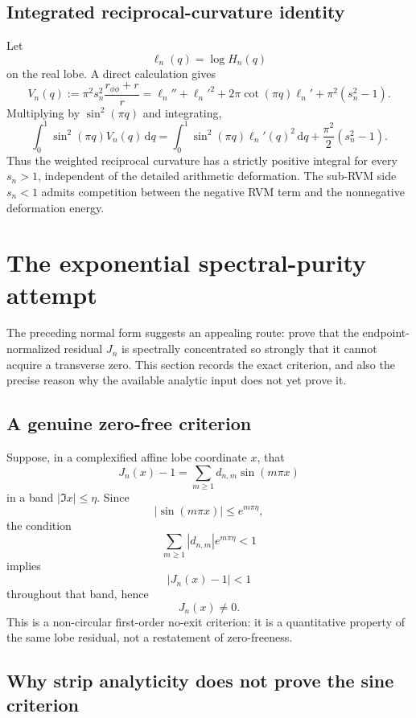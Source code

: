 \documentclass[11pt]{article}
\theoremstyle{definition}
\begin{document}
\subsection{Integrated reciprocal-curvature identity}

Let
\[
\ell_n(q)=\log H_n(q)
\]
on the real lobe.  A direct calculation gives
\[
\boxed{
V_n(q)
:=
\pi^2s_n^2\frac{r_{\phi\phi}+r}{r}
=
\ell_n''
+\ell_n'^2
+2\pi\cot(\pi q)\ell_n'
+\pi^2(s_n^2-1).
}
\]
Multiplying by $\sin^2(\pi q)$ and integrating,
\[
\boxed{
\int_0^1
\sin^2(\pi q)V_n(q)\,\mathrm dq
=
\int_0^1
\sin^2(\pi q)\ell_n'(q)^2\,\mathrm dq
+
\frac{\pi^2}{2}(s_n^2-1).
}
\]
Thus the weighted reciprocal curvature has a strictly positive integral for
every $s_n>1$, independent of the detailed arithmetic deformation.  The
sub-RVM side $s_n<1$ admits competition between the negative RVM term and the
nonnegative deformation energy.

\section{The exponential spectral-purity attempt}\label{sec:spectral-purity}

The preceding normal form suggests an appealing route: prove that the
endpoint-normalized residual $J_n$ is spectrally concentrated so strongly
that it cannot acquire a transverse zero.  This section records the exact
criterion, and also the precise reason why the available analytic input does
not yet prove it.

\subsection{A genuine zero-free criterion}

Suppose, in a complexified affine lobe coordinate $x$, that
\[
J_n(x)-1
=
\sum_{m\ge1} d_{n,m}\sin(m\pi x)
\]
in a band $|\Im x|\le\eta$.  Since
\[
|\sin(m\pi x)|
\le
e^{m\pi\eta},
\]
the condition
\[
\boxed{
\sum_{m\ge1}
|d_{n,m}|e^{m\pi\eta}<1
}
\]
implies
\[
|J_n(x)-1|<1
\]
throughout that band, hence
\[
\boxed{
J_n(x)\neq0.
}
\]
This is a non-circular first-order no-exit criterion: it is a quantitative
property of the same lobe residual, not a restatement of zero-freeness.

\subsection{Why strip analyticity does not prove the sine criterion}
\end{document}
